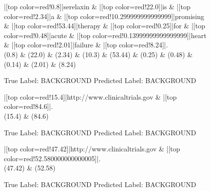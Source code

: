 \documentclass[a4paper, landscape]{article}
\begin{document}
\clearpage
\begin{figure}
\begin{center}
\begin{dependency}
\begin{deptext}
|[top color=red!0.8]|serelaxin \& |[top color=red!22.0]|is \& |[top color=red!2.34]|a \& |[top color=red!10.299999999999999]|promising \& |[top color=red!53.44]|therapy \& |[top color=red!0.25]|for \& |[top color=red!0.48]|acute \& |[top color=red!0.13999999999999999]|heart \& |[top color=red!2.01]|failure \& |[top color=red!8.24]|.\\
(0.8) \& (22.0) \& (2.34) \& (10.3) \& (53.44) \& (0.25) \& (0.48) \& (0.14) \& (2.01) \& (8.24)\\
\end{deptext}
\end{dependency}
\end{center}
\caption{True Label: BACKGROUND Predicted Label: BACKGROUND}
\end{figure}
\clearpage
\begin{figure}
\begin{center}
\begin{dependency}
\begin{deptext}
|[top color=red!15.4]|http://www.clinicaltrials.gov \& |[top color=red!84.6]|.\\
(15.4) \& (84.6)\\
\end{deptext}
\end{dependency}
\end{center}
\caption{True Label: BACKGROUND Predicted Label: BACKGROUND}
\end{figure}
\clearpage
\begin{figure}
\begin{center}
\begin{dependency}
\begin{deptext}
|[top color=red!47.42]|http://www.clinicaltrials.gov \& |[top color=red!52.580000000000005]|.\\
(47.42) \& (52.58)\\
\end{deptext}
\end{dependency}
\end{center}
\caption{True Label: BACKGROUND Predicted Label: BACKGROUND}
\end{figure}
\end{document}
